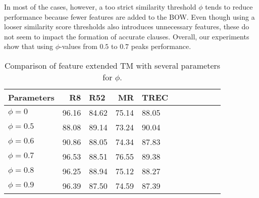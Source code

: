 \documentclass[11pt]{article}
\begin{document}
\par In most of the cases, however, a too strict similarity threshold $\phi$ tends to reduce performance because fewer features are added to the BOW. Even though using a looser similarity score thresholds also introduces unnecessary features, these do not seem to impact the formation of accurate clauses. Overall, our experiments show that using $\phi$-values from $0.5$ to $0.7$ peaks performance.



\begin{comment}

\begin{figure}[h]
    \centering
    \texttt{[image: Figures/R8CS.pdf]}
    \caption{Epoch-wise test accuracy based on various $\phi$-values for R8.}
    \label{fig10}
\end{figure}

\begin{figure}[h]
    \centering
    \texttt{[image: Figures/R52CS.pdf]}
    \caption{Epoch-wise test accuracy based on various $\phi$-values for R52 dataset.}
    \label{fig11}
\end{figure}

\begin{figure}[h]
    \centering
    \texttt{[image: Figures/TRECCS.pdf]}
    \caption{Epoch-wise test accuracy based on various parameter-values $\phi$ for TREC.}
    \label{fig12}
\end{figure}

\begin{figure}[h]
    \centering
    \texttt{[image: Figures/MRCS.pdf]}
    \caption{Epoch-wise test accuracy based on various parameter-values $\phi$ for MR.}
    \label{fig13}
\end{figure}

\end{comment}


\begin{table}
\centering
\begin{tabular}{lrlrlrlrlrl}
\hline \textbf{Parameters} & \textbf{R8} & \textbf{R52} & \textbf{MR} & \textbf{TREC} \\ \hline
$\phi=0$ & 96.16 & 84.62 & 75.14  & 88.05 \\
$\phi=0.5$ & 88.08 & 89.14 & 73.24  & 90.04 \\
$\phi=0.6$ & 90.86 & 88.05 & 74.34  & 87.83 \\
$\phi=0.7$ & 96.53 & 88.51 & 76.55  & 89.38 \\
$\phi=0.8$ & 96.25 & 88.94 & 75.12  & 88.27 \\
$\phi=0.9$ & 96.39 & 87.50 & 74.59  & 87.39 \\
\hline
\end{tabular}
\caption{\label{table66} Comparison of feature extended TM with several parameters for $\phi$.}
\end{table}
\end{document}
